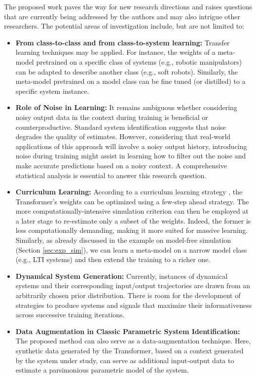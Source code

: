 \documentclass{article}
\begin{document}
The proposed work paves the way for new research directions and raises questions that are currently being addressed by the authors and may also intrigue other researchers. The potential areas of investigation include, but are not limited to:

\begin{itemize}


    \item \textbf{From class-to-class and from class-to-system learning:} Transfer learning techniques may be applied. For instance,  the weights of a meta-model pretrained on a specific class of systems (e.g., robotic manipulators) can be adapted to describe another class (e.g., soft robots). Similarly, the meta-model pretrained on a model class can be fine tuned (or distilled) to a specific system instance. 

    \item \textbf{Role of Noise in Learning:} It remains ambiguous whether considering noisy output data in the context during training is beneficial or counterproductive. Standard system identification suggests that noise   degrades the quality of estimates. However, considering that real-world applications of this approach will involve a noisy output history, introducing noise during training might assist in learning how to filter out the noise and make accurate predictions based on a noisy context. A comprehensive statistical analysis is essential to answer this research question.


    
    \item \textbf{Curriculum Learning:} According to a curriculum learning strategy \cite{wang2021survey},  the Transformer's weights can be optimized using a few-step ahead strategy. The more computationally-intensive simulation criterion can then be employed at a later stage to re-estimate only a subset of the weights. Indeed, the former  is less computationally demanding, making it more suited for massive  learning.  Similarly, as already discussed in the example on model-free simulation (Section \ref{sec:exp_sim}), we can learn a meta-model on a narrow model class (e.g., LTI systems) and then extend the training to a richer one. 
    
    
    \item \textbf{Dynamical System Generation:} Currently, instances of dynamical systems and their corresponding input/output trajectories are drawn from an arbitrarily chosen prior distribution. There is room for the development of strategies to produce systems and signals that maximize their   informativeness across successive training iterations.
    
    \item \textbf{Data Augmentation in Classic Parametric System Identification:} The proposed method can also serve as a data-augmentation technique. Here, synthetic data generated by the Transformer, based on a context generated by the system under study, can serve as additional input-output data to estimate a parsimonious parametric model of the system.
\end{itemize}




\end{document}
